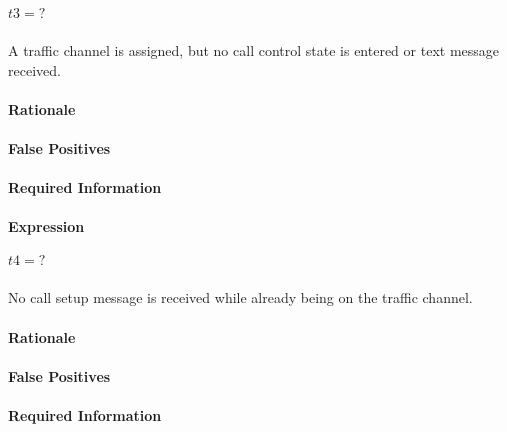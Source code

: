 \documentclass[a4paper,11pt,notitlepage,bigheadings,oneside]{scrartcl}
\begin{document}
$t3 = ?$

\subsubsection{}

A traffic channel is assigned, but no call control state is entered or text
message received.

\paragraph{Rationale}


\paragraph{False Positives}


\paragraph{Required Information}


\paragraph{Expression}

$t4 = ?$

\subsubsection{}

No call setup message is received while already being on the traffic channel.

\paragraph{Rationale}


\paragraph{False Positives}


\paragraph{Required Information}
\end{document}

